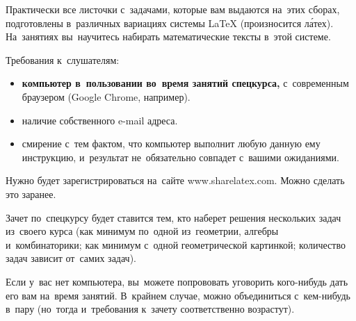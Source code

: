 Практически все листочки с~задачами, которые вам выдаются на~этих сборах,
подготовлены в~различных вариациях системы {\LaTeX} (произносится л\'{а}тех).
На~занятиях вы~научитесь набирать математические тексты в~этой системе.

Требования к~слушателям:
\begin{itemize}
\item
\textbf{компьютер в~пользовании во~время занятий спецкурса,}
с~современным браузером (Google Chrome, например).
\item
наличие собственного e-mail адреса.
\item
смирение с~тем фактом, что компьютер выполнит любую данную ему инструкцию,
и~результат не~обязательно совпадет с~вашими ожиданиями.
\end{itemize}

Нужно будет зарегистрироваться на~сайте www.sharelatex.com.
Можно сделать это заранее.

Зачет по~спецкурсу будет ставится тем, кто наберет решения нескольких задач
из~своего курса
(как минимум по~одной из~геометрии, алгебры и~комбинаторики;
как минимум с~одной геометрической картинкой;
количество задач зависит от~самих задач).

Если у~вас нет компьютера, вы~можете попрововать уговорить кого-нибудь дать его
вам на~время занятий.
В~крайнем случае, можно объединиться с~кем-нибудь в~пару
(но~тогда и~требования к~зачету соответственно возрастут).

